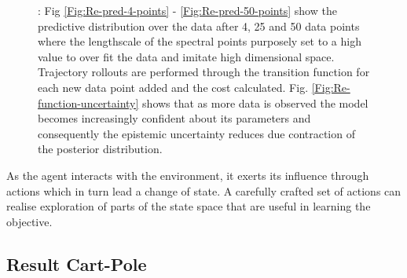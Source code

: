 \begin{figure}[H]
\caption[Reduction in epistemic uncertainty with added data]{: Fig \ref{Fig:Re-pred-4-points} - \ref{Fig:Re-pred-50-points} show the predictive distribution over the data after 4, 25 and 50 data points where the lengthscale of the spectral points purposely set to a high value to over fit the data and imitate high dimensional space. Trajectory rollouts are performed through the transition function for each new data point added and the cost calculated. Fig. \ref{Fig:Re-function-uncertainty} shows that as more data is observed the model becomes increasingly confident about its parameters and consequently the epistemic uncertainty reduces due contraction of the posterior distribution.}
\label{} 
\end{figure}


As the agent interacts with the environment, it exerts its influence through actions which in turn lead a change of state. A carefully crafted set of actions can realise exploration of parts of the state space that are useful in learning the objective.

\subsection{Result Cart-Pole}

